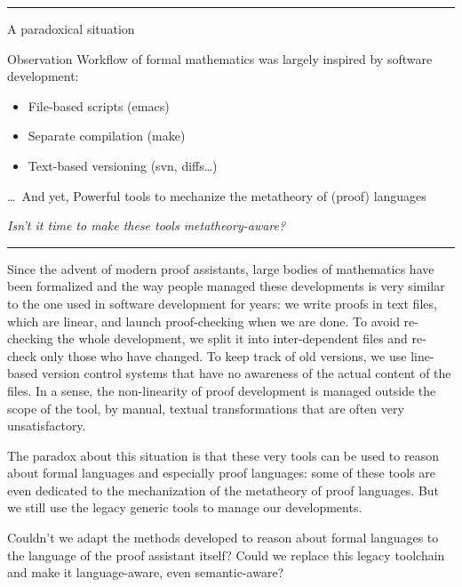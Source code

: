 \documentclass[12pt]{article} \usepackage{beamerarticle} \usepackage{fullpage}
\begin{document}
\hrule
\begin{frame}{A paradoxical situation}  
  \begin{block}{Observation}
    Workflow of formal mathematics was largely inspired by software
    development:
    \begin{itemize}
    \item File-based scripts (\textsf{emacs})
    \item Separate compilation (\textsf{make})
    \item Text-based versioning (\textsf{svn}, \textsf{diff}s\ldots)
    \end{itemize}
  \end{block}
  \pause
  \begin{block}{\ldots\ And yet,}
    Powerful tools to mechanize the metatheory of (proof) languages
  \end{block}
  \vspace{0.6em}
  \pause
  \begin{center}
    {\large \it Isn't it time to make these tools metatheory-aware?}
  \end{center}
\end{frame}
\hrule

Since the advent of modern proof assistants, large bodies of
mathematics have been formalized and the way people managed these
developments is very similar to the one used in software development
for years: we write proofs in text files, which are linear, and launch
proof-checking when we are done. To avoid re-checking the whole
development, we split it into inter-dependent files and re-check only
those who have changed. To keep track of old versions, we use
line-based version control systems that have no awareness of the
actual content of the files. In a sense, the non-linearity of proof
development is managed outside the scope of the tool, by manual,
textual transformations that are often very unsatisfactory.

The paradox about this situation is that these very tools can be used
to reason about formal languages and especially proof languages: some
of these tools are even dedicated to the mechanization of the
metatheory of proof languages. But we still use the legacy generic
tools to manage our developments.

Couldn't we adapt the methods developed to reason about formal
languages to the language of the proof assistant itself? Could we
replace this legacy toolchain and make it language-aware, even
semantic-aware?
\end{document}
